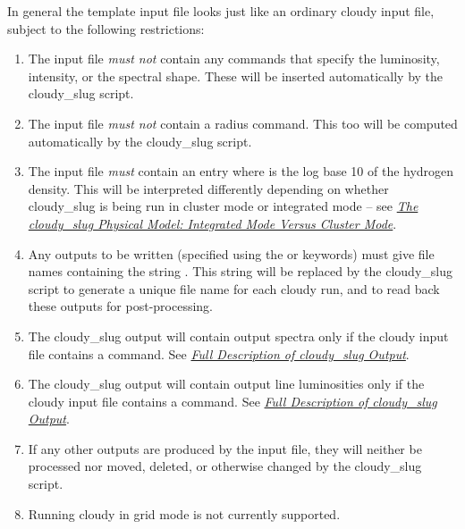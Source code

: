 \documentclass[letterpaper,10pt,english]{sphinxmanual}
\begin{document}
In general the template input file looks just like an ordinary cloudy
input file, subject to the following restrictions:
\begin{enumerate}
\item {} 
The input file \emph{must not} contain any commands that specify the
luminosity, intensity, or the spectral shape. These will be
inserted automatically by the cloudy\_slug script.

\item {} 
The input file \emph{must not} contain a radius command. This too will
be computed automatically by the cloudy\_slug script.

\item {} 
The input file \emph{must} contain an entry  where  is
the log base 10 of the hydrogen density. This will be interpreted
differently depending on whether cloudy\_slug is being run in
cluster mode or integrated mode -- see {\hyperref[cloudy:ssec-cloudy-cluster]{\emph{The cloudy\_slug Physical Model: Integrated Mode Versus Cluster Mode}}}.

\item {} 
Any outputs to be written (specified using the  or
 keywords) must give file names containing the string
. This string will be replaced by the
cloudy\_slug script to generate a unique file name for each cloudy
run, and to read back these outputs for post-processing.

\item {} 
The cloudy\_slug output will contain output spectra only if the
cloudy input file contains a  command. See
{\hyperref[cloudy:ssec-cloudy-output]{\emph{Full Description of cloudy\_slug Output}}}.

\item {} 
The cloudy\_slug output will contain output line luminosities only
if the cloudy input file contains a  command. See {\hyperref[cloudy:ssec-cloudy-output]{\emph{Full Description of cloudy\_slug Output}}}.

\item {} 
If any other outputs are produced by the input file, they will
neither be processed nor moved, deleted, or otherwise changed by
the cloudy\_slug script.

\item {} 
Running cloudy in grid mode is not currently supported.

\end{enumerate}
\end{document}
